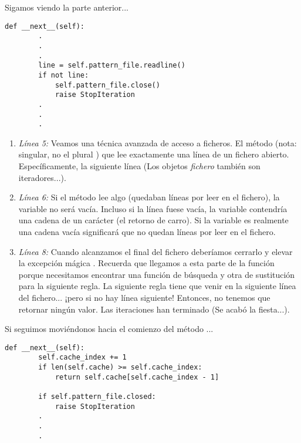 Sigamos viendo la parte anterior...

\noindent\begin{minipage}{\textwidth}
\begin{lstlisting}[mathescape=True]
    def __next__(self):
        .
        .
        .
        line = self.pattern_file.readline()
        if not line:
            self.pattern_file.close()
            raise StopIteration
        .
        .
        .
\end{lstlisting}
\end{minipage}

\begin{enumerate}

\item \emph{Línea 5:} Veamos una técnica avanzada de acceso a ficheros. El método  (nota: singular, no el plural ) que lee exactamente una línea de un fichero abierto. Específicamente, la siguiente línea (Los objetos \emph{fichero} también son iteradores...).

\item \emph{Línea 6:} Si el método  lee algo (quedaban líneas por leer en el fichero), la variable  no será vacía. Incluso si la línea fuese vacía, la variable contendría una cadena de un carácter  (el retorno de carro). Si la variable  es realmente una cadena vacía significará que no quedan líneas por leer en el fichero.

\item \emph{Línea 8:} Cuando alcanzamos el final del fichero deberíamos cerrarlo y elevar la excepción mágica . Recuerda que llegamos a esta parte de la función porque necesitamos encontrar una función de búsqueda y otra de sustitución para la siguiente regla. La siguiente regla tiene que venir en la siguiente línea del fichero... ¡pero si no hay línea siguiente! Entonces, no tenemos que retornar ningún valor. Las iteraciones han terminado (Se acabó la fiesta...).

\end{enumerate}

Si seguimos moviéndonos hacia el comienzo del método ...

\noindent\begin{minipage}{\textwidth}
\begin{lstlisting}[mathescape=True]
    def __next__(self):
        self.cache_index += 1
        if len(self.cache) >= self.cache_index:
            return self.cache[self.cache_index - 1]

        if self.pattern_file.closed:
            raise StopIteration
        .
        .
        .
\end{lstlisting}
\end{minipage}

